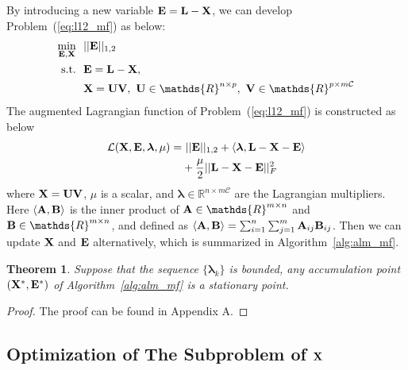 \documentclass[letterpaper]{article}
\newtheorem{theorem}{Theorem}
\def\bA{{\bf A}}
\def\bB{{\bf B}}
\def\bE{{\bf E}}
\def\blambda{{\bm \lambda}}
\def\calL{{\mathcal{L}}}
\def\calC{{\mathcal{C}}}
\def\bL{{\bf L}}
\def\bU{{\bf U}}
\def\bV{{\bf V}}
\def\dsR{\mathds{R}}
\def\bX{{\bf X}}
\def\bA{{\bf A}}
\def\bX{{\bf X}}
\def\st{{\text{s.t.}}}
\begin{document}
By introducing a new variable $\bE = \bL - \bX$, we can develop Problem~(\ref{eq:l12_mf}) as below:
{\small
\begin{align}\label{eq:mf_l21_constrained}
  \min_{\bE, \bX} ~&~ || \bE ||_{1,2}      \nonumber \\
  \st             ~&~ \bE = \bL - \bX  ,   \nonumber \\
                  ~&~ \bX = \bU \bV,~\bU \in \dsR^{n \times p},~\bV \in \dsR^{p \times m \calC}
\end{align}
}
\noindent
The augmented Lagrangian function of Problem~(\ref{eq:l12_mf}) is constructed as below
{\small
\begin{align}\label{eq:lagrangian_l21}
  \calL (\bX, \bE, \blambda, \mu) = &~ || \bE ||_{1,2} + \langle \blambda, \bL - \bX - \bE \rangle      \nonumber \\
                                    & + \frac{\mu}{2} || \bL - \bX - \bE ||_F^2
\end{align}
}
\noindent
where $\bX = \bU \bV$, $\mu$ is a scalar,
and $\blambda \in \dsR^{n \times m\calC}$ are the Lagrangian multipliers.
Here $\langle \bA, \bB \rangle$ is the inner product of $\bA \in \dsR^{m \times n}$ and $\bB \in \dsR^{m \times n}$, and defined as $\langle \bA, \bB \rangle = \sum_{i=1}^{n} \sum_{j=1}^{m} \bA_{ij} \bB_{ij}$.
Then we can update $\bX$ and $\bE$ alternatively, which is summarized in Algorithm~\ref{alg:alm_mf}.




\begin{theorem}
\label{theorem:alm_convergence}
  Suppose that the sequence $\{ \blambda_{k} \}$ is bounded, any accumulation point $(\bX^*, \bE^*)$ of Algorithm~\ref{alg:alm_mf} is a stationary point.
\end{theorem}

\begin{proof}
\label{proof:proof_AA}
  The proof can be found in Appendix A.
\end{proof}




\subsection{Optimization of The Subproblem of $\bX$}
\end{document}
